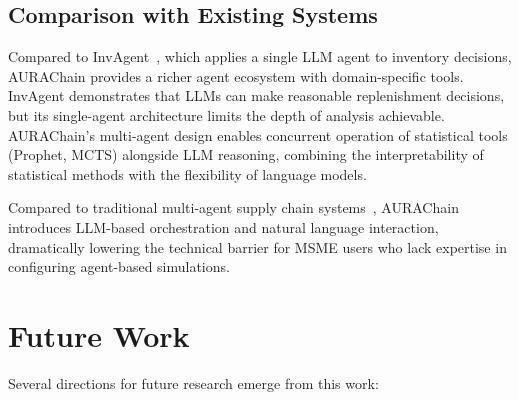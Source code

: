 \documentclass[conference]{IEEEtran}
\begin{document}
\subsection{Comparison with Existing Systems}

Compared to InvAgent~\cite{invagent2024}, which applies a single LLM agent to inventory decisions, AURAChain provides a richer agent ecosystem with domain-specific tools. InvAgent demonstrates that LLMs can make reasonable replenishment decisions, but its single-agent architecture limits the depth of analysis achievable. AURAChain's multi-agent design enables concurrent operation of statistical tools (Prophet, MCTS) alongside LLM reasoning, combining the interpretability of statistical methods with the flexibility of language models.

Compared to traditional multi-agent supply chain systems~\cite{mas_scm_insights}, AURAChain introduces LLM-based orchestration and natural language interaction, dramatically lowering the technical barrier for MSME users who lack expertise in configuring agent-based simulations.

\section{Future Work}

Several directions for future research emerge from this work:
\end{document}
